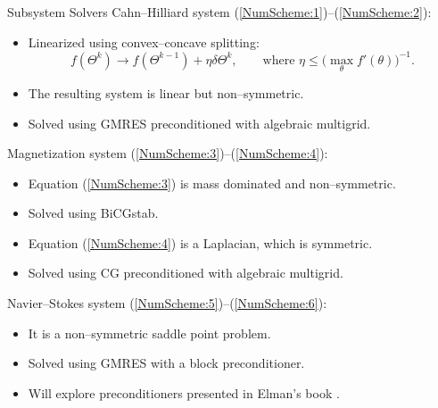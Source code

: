 \documentclass[9pt]{beamer}
\begin{document}
\begin{frame}{Subsystem Solvers}
Cahn--Hilliard system (\ref{NumScheme:1})--(\ref{NumScheme:2}):
\begin{itemize}
\item Linearized using convex--concave splitting:
$$
f(\Theta^k)\to f(\Theta^{k-1}) + \eta \delta \Theta^k, \quad \quad \text{where } \eta\leq \big(\max_\theta f'(\theta)\big)^{-1}.
$$
\item The resulting system is linear but non--symmetric.
\item Solved using GMRES preconditioned with algebraic multigrid.
\end{itemize}
Magnetization system (\ref{NumScheme:3})--(\ref{NumScheme:4}):
\begin{itemize}
\item Equation (\ref{NumScheme:3}) is mass dominated and non--symmetric.
\item Solved using BiCGstab.
\item Equation (\ref{NumScheme:4}) is a Laplacian, which is symmetric.
\item Solved using CG preconditioned with algebraic multigrid.
\end{itemize}

Navier--Stokes system (\ref{NumScheme:5})--(\ref{NumScheme:6}):
\begin{itemize}
\item It is a non--symmetric saddle point problem.
\item Solved using GMRES with a block preconditioner.
\item Will explore preconditioners presented in Elman's book \cite{Precond}.
\end{itemize}
\end{frame}
\end{document}
